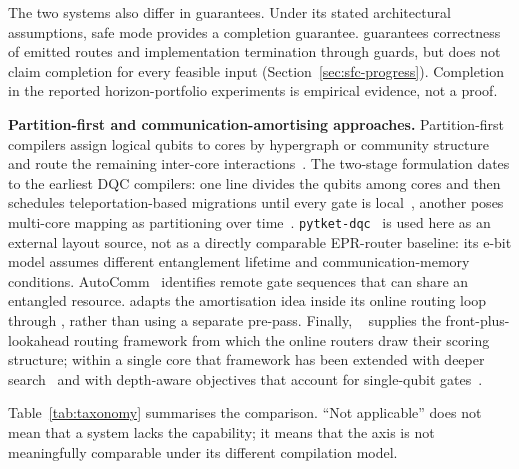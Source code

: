 The two systems also differ in guarantees. Under its stated architectural
assumptions, \dSABRE{} safe mode provides a completion guarantee.
\PORTER{} guarantees correctness of emitted routes and implementation
termination through guards, but does not claim completion for every feasible
input (Section~\ref{sec:sfc-progress}). Completion in the reported
horizon-portfolio experiments is empirical evidence, not a proof.

\textbf{Partition-first and communication-amortising approaches.}
Partition-first compilers assign logical qubits to cores by hypergraph or
community structure and route the remaining inter-core
interactions~\cite{escofet2023hqa,pytketdqc2024,daei2020optimized}. The
two-stage formulation dates to the earliest DQC compilers: one line divides
the qubits among cores and then schedules teleportation-based migrations
until every gate is local~\cite{sundaram2021efficient}, another poses
multi-core mapping as partitioning over time~\cite{ovide2023mapping}.
\texttt{pytket-dqc}~\cite{pytketdqc2024} is used here as an external layout source, not as a directly comparable EPR-router baseline: its e-bit
model assumes different entanglement lifetime and communication-memory
conditions. AutoComm~\cite{wu2022autocomm} identifies remote gate sequences
that can share an entangled resource. \PORTER{} adapts the amortisation idea
inside its online routing loop through \TeleGatePacket{}, rather than using a
separate pre-pass. Finally, \SABRE{}~\cite{li2019tackling} supplies the
front-plus-lookahead routing framework from which the online routers draw
their scoring structure; within a single core that framework has been
extended with deeper search~\cite{zhou2022mcts} and with depth-aware
objectives that account for single-qubit gates~\cite{li2023singlequbit}.

Table~\ref{tab:taxonomy} summarises the comparison. ``Not applicable'' does
not mean that a system lacks the capability; it means that the axis is not
meaningfully comparable under its different compilation model.

